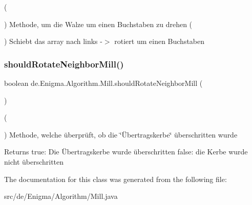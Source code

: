 (

) Methode, um die Walze um einen Buchstaben zu drehen (

) Schiebt das array nach links -\/$>$ rotiert um einen Buchstaben \mbox{\label{classde_1_1_enigma_1_1_algorithm_1_1_mill_ade4280b579540485a67e742202682cbf}} 
\subsubsection{\texorpdfstring{should\+Rotate\+Neighbor\+Mill()}{shouldRotateNeighborMill()}}
{\footnotesize\ttfamily boolean de.\+Enigma.\+Algorithm.\+Mill.\+should\+Rotate\+Neighbor\+Mill (\begin{DoxyParamCaption}{ }\end{DoxyParamCaption})}

(

) Methode, welche überprüft, ob die \char`\"{}Übertragskerbe\char`\"{} überschritten wurde \begin{DoxyReturn}{Returns}
true\+: Die Übertragskerbe wurde überschritten false\+: die Kerbe wurde nicht überschritten 
\end{DoxyReturn}


The documentation for this class was generated from the following file\+:\begin{DoxyCompactItemize}
\item 
src/de/\+Enigma/\+Algorithm/Mill.\+java\end{DoxyCompactItemize}
